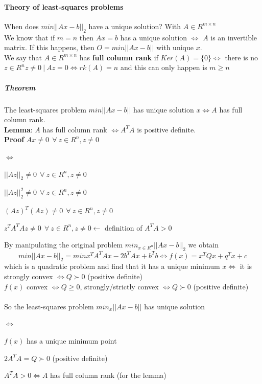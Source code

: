 \documentclass[10pt]{report}
\begin{document}
\paragraph{Theory of least-squares problems} When does $min ||Ax-b||_2$ have a unique solution? With $A \in R^{m\times n}$\\
We know that if $m=n$ then $Ax = b$ has a unique solution $\Leftrightarrow$ $A$ is an invertible matrix. If this happens, then $O = min||Ax-b||$ with unique $x$.\\
We say that $A\in R^{m\times n}$ has \textbf{full column rank} if $Ker(A) = \{0\} \Leftrightarrow$ there is no $z\in R^n z\neq 0\:|\:Az=0\Leftrightarrow rk(A) = n$ and this can only happen is $m\geq n$\\
\subparagraph{Theorem}The least-squares problem $min ||Ax-b||$ has unique solution $x\Leftrightarrow A$ has full column rank.\\
\textbf{Lemma}: $A$ has full column rank $\Leftrightarrow A^TA$ is positive definite.\\
\textbf{Proof} $Ax \neq 0\:\:\forall\:z\in R^n, z\neq 0$
\begin{list}{$\Leftrightarrow$}{}
	\item $||Az||_2 \neq 0\:\:\forall\:z\in R^n, z\neq 0$
	\item $||Az||_2^2 \neq 0\:\:\forall\:z\in R^n, z\neq 0$
	\item $(Az)^T(Az)\neq 0\:\:\forall\:z\in R^n, z\neq 0$
	\item $z^TA^TAz\neq 0\:\:\forall\:z\in R^n, z\neq 0 \longleftarrow$ definition of $A^TA > 0$
\end{list}
By manipulating the original problem $min_{x\in R^n} ||Ax-b||_2$ we obtain $$min ||Ax-b||_2 = min x^TA^TAx - 2b^TAx + b^Tb \Leftrightarrow f(x) = x^TQx + q^Tx + c$$ which is a quadratic problem and find that it has a unique minimum $x \Leftrightarrow$ it is strongly convex $\Leftrightarrow Q \succ 0$ (positive definite)\\
$f(x)$ convex $\Leftrightarrow Q \geq 0$, strongly/strictly convex $\Leftrightarrow Q \succ 0$ (positive definite)\\\\
So the least-squares problem $min_x ||Ax-b||$ has unique solution
\begin{list}{$\Leftrightarrow$}{}
	\item $f(x)$ has a unique minimum point
	\item $2A^TA = Q \succ 0$ (positive definite)
	\item $A^TA > 0 \Leftrightarrow A$ has full column rank (for the lemma)
\end{list}
\end{document}

